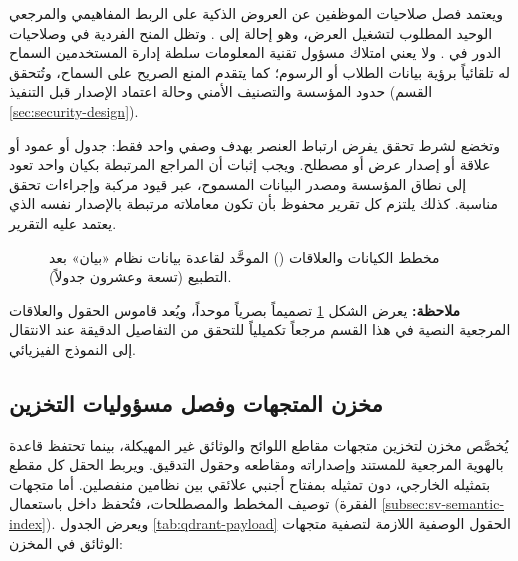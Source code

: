 ويعتمد فصل صلاحيات الموظفين عن العروض الذكية على الربط المفاهيمي والمرجعي الوحيد المطلوب لتشغيل العرض، وهو إحالة  إلى . وتظل المنح الفردية في  وصلاحيات الدور في . ولا يعني امتلاك مسؤول تقنية المعلومات سلطة إدارة المستخدمين السماح له تلقائياً برؤية بيانات الطلاب أو الرسوم؛ كما يتقدم المنع الصريح على السماح، وتُتحقق حدود المؤسسة والتصنيف الأمني وحالة اعتماد الإصدار قبل التنفيذ (القسم \ref{sec:security-design}).

وتخضع  لشرط تحقق يفرض ارتباط العنصر بهدف وصفي واحد فقط: جدول أو عمود أو علاقة أو إصدار عرض أو مصطلح. ويجب إثبات أن المراجع المرتبطة بكيان واحد تعود إلى نطاق المؤسسة ومصدر البيانات المسموح، عبر قيود مركبة وإجراءات تحقق مناسبة. كذلك يلتزم كل تقرير محفوظ بأن تكون معاملاته مرتبطة بالإصدار نفسه الذي يعتمد عليه التقرير.

\begin{figure}[H]
  \centering
  
  \caption{مخطط الكيانات والعلاقات () الموحَّد لقاعدة بيانات نظام «بيان» بعد التطبيع  (تسعة وعشرون جدولاً).}
  \label{fig:bayan-er}
\end{figure}

\noindent\textbf{ملاحظة:} يعرض الشكل \ref{fig:bayan-er} تصميماً بصرياً موحداً، ويُعد قاموس الحقول والعلاقات المرجعية النصية في هذا القسم مرجعاً تكميلياً للتحقق من التفاصيل الدقيقة عند الانتقال إلى النموذج الفيزيائي.

\subsection{مخزن المتجهات  وفصل مسؤوليات التخزين}
\label{subsec:vector-store}

يُخصَّص مخزن  \cite{qdrant2024} لتخزين متجهات مقاطع اللوائح والوثائق غير المهيكلة، بينما تحتفظ قاعدة  بالهوية المرجعية للمستند وإصداراته ومقاطعه وحقول التدقيق. ويربط الحقل  كل مقطع بتمثيله الخارجي، دون تمثيله بمفتاح أجنبي علائقي بين نظامين منفصلين. أما متجهات توصيف المخطط والمصطلحات، فتُحفظ داخل  باستعمال  (الفقرة \ref{subsec:sv-semantic-index}). ويعرض الجدول \ref{tab:qdrant-payload} الحقول الوصفية اللازمة لتصفية متجهات الوثائق في المخزن:

